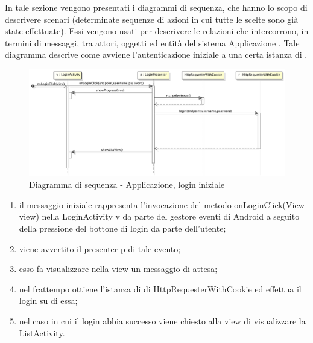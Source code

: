         In tale sezione vengono presentati i diagrammi di sequenza, che hanno lo scopo di descrivere scenari (determinate sequenze di azioni in cui tutte le scelte sono già state effettuate). Essi vengono usati per descrivere le relazioni che intercorrono, in termini di messaggi, tra attori, oggetti ed entità del sistema Applicazione .
            Tale diagramma descrive come avviene l'autenticazione iniziale a una certa istanza di .
            \begin{figure}[H]
                \centering
                \includegraphics[scale=0.3]{DefinizioneDiProdotto/Pics/ApplicazioneLogin}
                \caption{Diagramma di sequenza - Applicazione, login iniziale}
            \end{figure}
            \begin{enumerate}
                \item il messaggio iniziale rappresenta l'invocazione del metodo onLoginClick(View view) nella LoginActivity v da parte del gestore eventi di Android a seguito della pressione del bottone di login da parte dell'utente;
                \item viene avvertito il presenter p di tale evento;
                \item esso fa visualizzare nella view un messaggio di attesa;
                \item nel frattempo ottiene l'istanza di di HttpRequesterWithCookie ed effettua il login su di essa;
                \item nel caso in cui il login abbia successo viene chiesto alla view di visualizzare la ListActivity.
            \end{enumerate}

